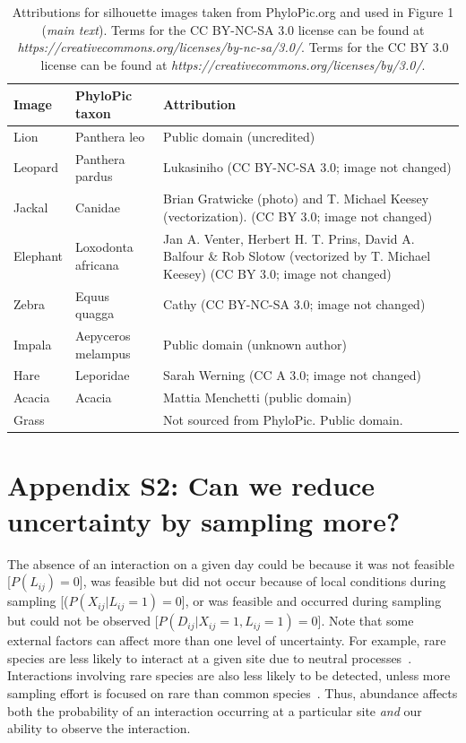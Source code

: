 \documentclass[12pt]{article}
\begin{document}
  \begin{table}[h!]
  \caption{Attributions for silhouette images taken from PhyloPic.org and used in Figure 1 (\emph{main text}). Terms for the CC BY-NC-SA 3.0 license can be found at \emph{https://creativecommons.org/licenses/by-nc-sa/3.0/}. Terms for the CC BY 3.0 license can be found at \emph{https://creativecommons.org/licenses/by/3.0/}.}
  \begin{tabular}{l|l m{10cm}}
  Image & PhyloPic taxon & Attribution \\
  \hline
  Lion & Panthera leo & Public domain (uncredited) \\
  Leopard & Panthera pardus & Lukasiniho (CC BY-NC-SA 3.0; image not changed) \\
  Jackal & Canidae & Brian Gratwicke (photo) and T. Michael Keesey (vectorization). (CC BY 3.0; image not changed) \\
  Elephant & Loxodonta africana & Jan A. Venter, Herbert H. T. Prins, David A. Balfour \& Rob Slotow (vectorized by T. Michael Keesey) (CC BY 3.0; image not changed) \\
  Zebra & Equus quagga & Cathy (CC BY-NC-SA 3.0; image not changed) \\
  Impala & Aepyceros melampus & Public domain (unknown author) \\
  Hare & Leporidae & Sarah Werning (CC A 3.0; image not changed) \\
  Acacia & Acacia & Mattia Menchetti (public domain) \\
  Grass & & Not sourced from PhyloPic. Public domain. \\
  \hline
  \end{tabular}
  \end{table}


\clearpage


\section*{Appendix S2: Can we reduce uncertainty by sampling more?}

  
        The absence of an interaction on a given day could be because it was not feasible [$P(L_{ij}) = 0$], was feasible but did not occur because of local conditions during sampling [($P(X_{ij}|L_{ij} = 1) = 0$], or was feasible and occurred during sampling but could not be observed [$P(D_{ij}|X_{ij} = 1,L_{ij} = 1) = 0$]. Note that some external factors can affect more than one level of uncertainty. For example, rare species are less likely to interact at a given site due to neutral processes~\citep{Jordano2016,Graham2018}. Interactions involving rare species are also less likely to be detected, unless more sampling effort is focused on rare than common species~\citep{Bartomeus2013,Jordano2016}. Thus, abundance affects both the probability of an interaction occurring at a particular site \emph{and} our ability to observe the interaction. 
\end{document}
